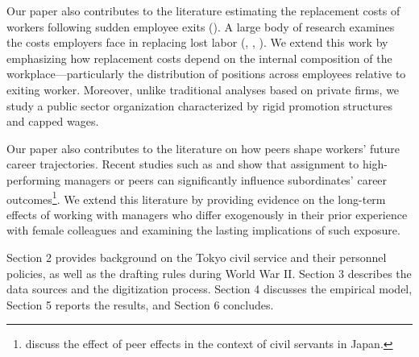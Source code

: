 Our paper also contributes to the literature estimating the replacement costs of workers following sudden employee exits (\cite{JaegerDeath}). A large body of research examines the costs employers face in replacing lost labor (\cite{doi:10.1086/253212}, \cite{doi:10.1086/258715}, \cite{ALAN2011973}). We extend this work by emphasizing how replacement costs depend on the internal composition of the workplace—particularly the distribution of positions across employees relative to exiting worker. Moreover, unlike traditional analyses based on private firms, we study a public sector organization characterized by rigid promotion structures and capped wages.


Our paper also contributes to the literature on how peers shape workers' future career trajectories. Recent studies such as \cite{Minni_2025_invisiblehand} and \cite{10.1257/aer.20210863} show that assignment to high-performing managers or peers can significantly influence subordinates' career outcomes\footnote{\cite{https://doi.org/10.1111/ecin.13278} discuss the effect of peer effects in the context of civil servants in Japan.}. We extend this literature by providing evidence on the long-term effects of working with managers who differ exogenously in their prior experience with female colleagues and examining the lasting implications of such exposure.




Section 2 provides background on the Tokyo civil service and their personnel policies, as well as the drafting rules during World War II. Section 3 describes the data sources and the digitization process. Section 4 discusses the empirical model, Section 5 reports the results, and Section 6 concludes.
